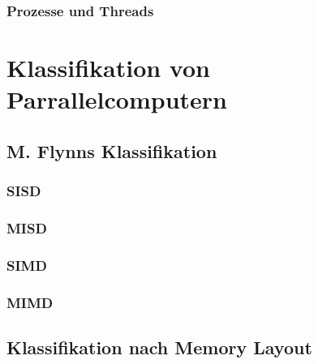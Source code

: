 \subsubsection{Prozesse und Threads}


\section{Klassifikation von Parrallelcomputern}

\subsection{M. Flynns Klassifikation}

\subsubsection{SISD}
\subsubsection{MISD}
\subsubsection{SIMD}
\subsubsection{MIMD}

\subsection{Klassifikation nach Memory Layout}
